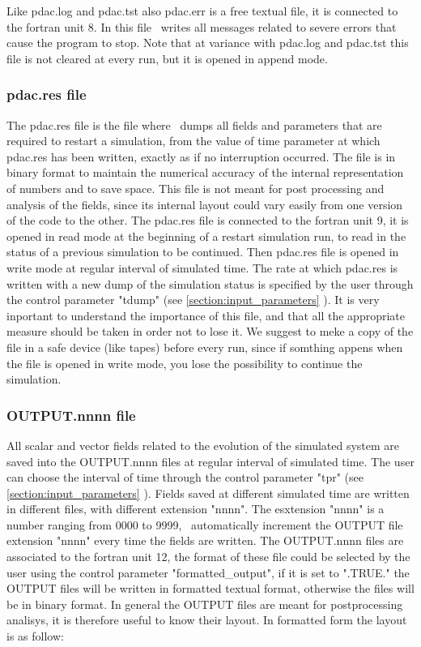Like pdac.log and pdac.tst also pdac.err is a free textual file,
it is connected to the fortran unit 8. In this file \PDAC\ writes
all messages related to severe errors that cause the program to stop.
Note that at variance with pdac.log and pdac.tst this file is not 
cleared at every run, but it is opened in append mode.

\subsubsection{pdac.res file}
\label{section:padc_res}

The pdac.res file is the file where \PDAC\ dumps all fields and
parameters that are required to restart a simulation, from the 
value of time parameter at which pdac.res has been written, exactly as
if no interruption occurred. The file is in binary format to maintain
the numerical accuracy of the internal representation of numbers
and to save space. This file is not meant for post processing
and analysis of the fields, since its internal layout could
vary easily from one version of the code to the other.
The pdac.res file is connected to the fortran unit 9, it is
opened in read mode at the beginning of a restart simulation run,
to read in the status of a previous simulation to be continued.
Then pdac.res file is opened in write mode at regular interval
of simulated time. The rate at which pdac.res is written
with a new dump of the simulation status is specified by
the user through the control parameter "tdump" (see \ref{section:input_parameters} ).
It is very inportant to understand the importance of this file,
and that all the appropriate measure should be taken in order
not to lose it. We suggest to meke a copy of the file in 
a safe device (like tapes) before every run, since if somthing appens
when the file is opened in write mode, you lose the possibility
to continue the simulation.


\subsubsection{OUTPUT.nnnn file}

All scalar and vector fields related to the evolution of the simulated
system are saved into the OUTPUT.nnnn files at regular interval of
simulated time. The user can choose the interval of time through
the control parameter "tpr" (see \ref{section:input_parameters} ).
Fields saved at different simulated time are written in different
files, with different extension "nnnn". The esxtension "nnnn" is
a number ranging from 0000 to 9999, \PDAC\ automatically increment 
the OUTPUT file extension "nnnn" every time the fields are written. 
The OUTPUT.nnnn files are associated to the fortran unit 12, 
the format of these file could be selected by the user using
the control parameter "formatted\_output", if it is set to ".TRUE."
the OUTPUT files will be written in formatted textual format,
otherwise the files will be in binary format.
In general the OUTPUT files are meant for postprocessing analisys,
it is therefore useful to know their layout.
In formatted form the layout is as follow:

